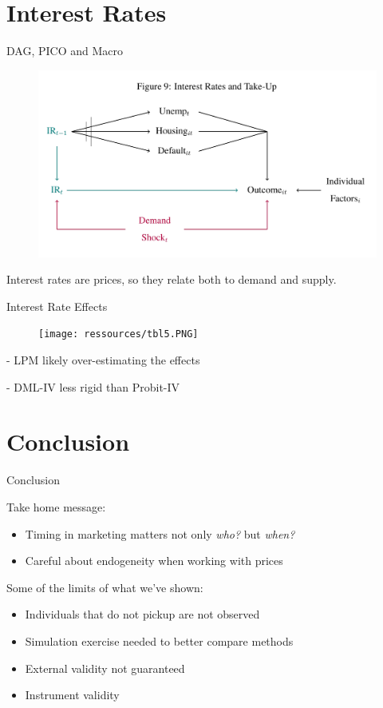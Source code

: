 \documentclass{beamer}
\begin{document}
\section{Interest Rates}
\begin{frame}{DAG, PICO and Macro}
\begin{figure}[h!]
    \centering
    \includegraphics[width=.88\textwidth]{ressources/fig9.jpeg}
\end{figure}
\vspace*{-0.25cm}
Interest rates are prices, so they relate both to demand and supply.

\end{frame}

\begin{frame}{Interest Rate Effects}
\begin{figure}[h!]
    \centering
    \texttt{[image: ressources/tbl5.PNG]}
\end{figure}

- LPM likely over-estimating the effects

- DML-IV less rigid than Probit-IV

\end{frame}

\section{Conclusion}
\begin{frame}{Conclusion}

Take home message:
\begin{itemize}
\item Timing in marketing matters not only \emph{who?} but \emph{when?}
\item Careful about endogeneity when working with prices
\end{itemize}

Some of the limits of what we've shown:
\begin{itemize}
\item Individuals that do not pickup are not observed
\item Simulation exercise needed to better compare methods
\item External validity not guaranteed 
\item Instrument validity 
\end{itemize}


\end{frame}
\end{document}
